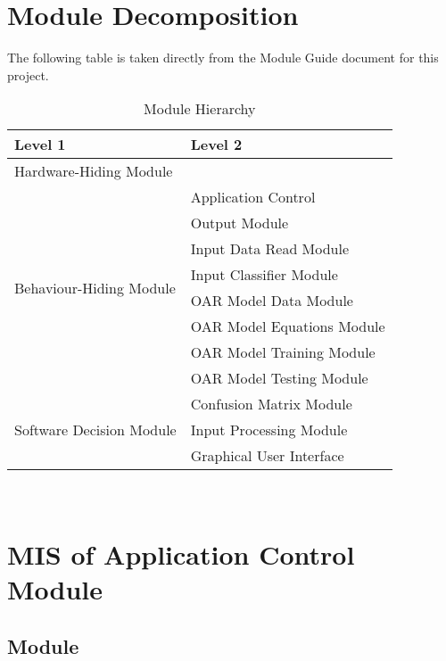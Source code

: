 \documentclass[12pt, titlepage]{article}
\begin{document}
\section{Module Decomposition}

The following table is taken directly from the Module Guide document for this project.

\begin{table}[h!]
  \centering
  \begin{tabular}{p{} p{}}
  \toprule
  \textbf{Level 1} & \textbf{Level 2}\\
  \midrule
    
  {Hardware-Hiding Module} & ~\\
  \midrule
    
  \multirow{8}{0.3\textwidth}{Behaviour-Hiding Module}
    & Application Control \\
    & Output Module\\
    & Input Data Read Module \\
    & Input Classifier Module\\
    & OAR Model Data Module \\
    & OAR Model Equations Module \\
    & OAR Model Training Module \\
    & OAR Model Testing Module \\
    \midrule
    
    \multirow{3}{0.3\textwidth}{Software Decision Module}
      & Confusion Matrix Module \\
      & Input Processing Module \\
      & Graphical User Interface \\
    \bottomrule
    
    \end{tabular}
  \caption{Module Hierarchy}
  \label{TblMH}
  \end{table}
  
\newpage
~\newpage

\section{MIS of Application Control Module} \label{ModuleAC} 



\subsection{Module}
\end{document}
